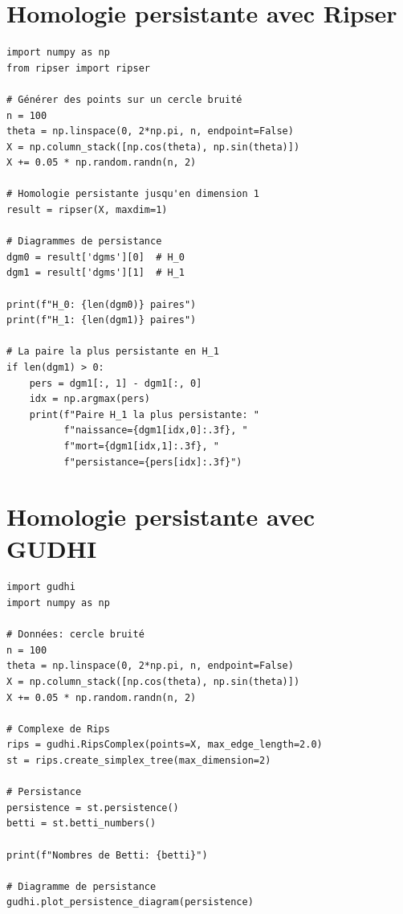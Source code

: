 \section{Homologie persistante avec Ripser}

\begin{codeblock}[title=\textbf{Calcul avec Ripser en Python}]
\begin{verbatim}
import numpy as np
from ripser import ripser

# Générer des points sur un cercle bruité
n = 100
theta = np.linspace(0, 2*np.pi, n, endpoint=False)
X = np.column_stack([np.cos(theta), np.sin(theta)])
X += 0.05 * np.random.randn(n, 2)

# Homologie persistante jusqu'en dimension 1
result = ripser(X, maxdim=1)

# Diagrammes de persistance
dgm0 = result['dgms'][0]  # H_0
dgm1 = result['dgms'][1]  # H_1

print(f"H_0: {len(dgm0)} paires")
print(f"H_1: {len(dgm1)} paires")

# La paire la plus persistante en H_1
if len(dgm1) > 0:
    pers = dgm1[:, 1] - dgm1[:, 0]
    idx = np.argmax(pers)
    print(f"Paire H_1 la plus persistante: "
          f"naissance={dgm1[idx,0]:.3f}, "
          f"mort={dgm1[idx,1]:.3f}, "
          f"persistance={pers[idx]:.3f}")
\end{verbatim}
\end{codeblock}

\section{Homologie persistante avec GUDHI}

\begin{codeblock}[title=\textbf{Calcul avec GUDHI}]
\begin{verbatim}
import gudhi
import numpy as np

# Données: cercle bruité
n = 100
theta = np.linspace(0, 2*np.pi, n, endpoint=False)
X = np.column_stack([np.cos(theta), np.sin(theta)])
X += 0.05 * np.random.randn(n, 2)

# Complexe de Rips
rips = gudhi.RipsComplex(points=X, max_edge_length=2.0)
st = rips.create_simplex_tree(max_dimension=2)

# Persistance
persistence = st.persistence()
betti = st.betti_numbers()

print(f"Nombres de Betti: {betti}")

# Diagramme de persistance
gudhi.plot_persistence_diagram(persistence)
\end{verbatim}
\end{codeblock}

